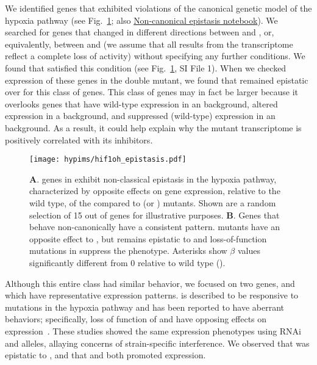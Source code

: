 We identified genes that exhibited violations of the canonical genetic
model of the hypoxia pathway (see Fig.~\ref{fig:hif1oh}; also
\href{https://wormlabcaltech.github.io/mprsq/analysis_notebooks/7_hifoh.html}
{Non-canonical epistasis notebook}). We searched for genes that changed in different
directions between \egl{} and \vhl{}, or, equivalently, between \rhy{} and
\vhl{} (we assume that all results from the \rhy{} transcriptome reflect a
complete loss of  activity) without specifying any further
conditions. We found \hifohtargets{} that satisfied this condition (see
Fig.~\ref{fig:hif1oh}, SI File 1). When we checked expression of
these genes in the double mutant, we found that  remained epistatic
over  for this class of genes. This class of genes may in fact be
larger because it overlooks genes that have wild-type expression in an
\egl{} background, altered expression in a \vhl{} background, and suppressed
(wild-type) expression  in an \eglvhl{} background.
As a result, it could help
explain why the \hif{} mutant transcriptome is positively correlated with its
inhibitors.

\begin{figure}[tbhp]
  \centering
  \texttt{[image: hypims/hif1oh\_epistasis.pdf]}
  \caption{
    \textbf{A}. \hifohtargets{} genes in \cel{} exhibit non-classical epistasis
    in the hypoxia pathway, characterized by opposite effects on gene expression,
    relative to the wild type, of the \vhl{} compared to \egl{} (or \rhy{})
    mutants. Shown are a random selection of 15 out of \hifohtargets{} genes for
    illustrative purposes. \textbf{B}. Genes that behave non-canonically  have a
    consistent pattern. \vhl{} mutants have an opposite effect to \egl{}, but
     remains epistatic to  and loss-of-function
    mutations in  suppress the \egl{} phenotype. Asterisks show
    $\beta$ values significantly different from 0 relative to wild type
    ().
  }
\label{fig:hif1oh}
\end{figure}

Although this entire class had similar behavior, we focused on two genes, \nlp{}
and \ftna{} which have representative expression patterns. \ftna{} is described
to be responsive to mutations in the hypoxia pathway and has been reported to
have aberrant behaviors; specifically, loss of function of  and
 have opposing effects on \ftna{}
expression~\citep{Ackerman2012,Romney2011}. These studies showed the same \ftna{}
expression phenotypes using RNAi and alleles, allaying concerns of
strain-specific interference. We observed that  was epistatic to
, and that  and  both promoted \ftna{}
expression.

